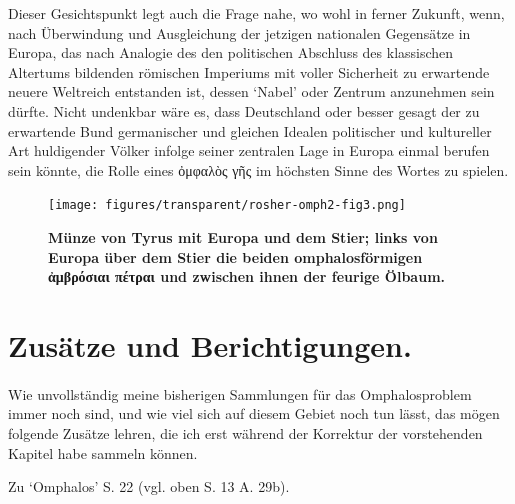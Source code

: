 \documentclass[a4paper, 11pt, oneside]{article}
\begin{document}
Dieser Gesichtspunkt legt auch die Frage nahe, wo wohl in ferner Zukunft, wenn, nach Überwindung und Ausgleichung der jetzigen nationalen Gegensätze in Europa, das nach Analogie des den politischen Abschluss des klassischen Altertums bildenden römischen Imperiums mit voller Sicherheit zu erwartende neuere Weltreich entstanden ist, dessen `Nabel' oder Zentrum anzunehmen sein dürfte. Nicht undenkbar wäre es, dass Deutschland oder besser gesagt der zu erwartende Bund germanischer und gleichen Idealen politischer und kultureller Art huldigender Völker infolge seiner zentralen Lage in Europa einmal berufen sein könnte, die Rolle eines ὀμφαλὸς γῆς im höchsten Sinne des Wortes zu spielen.
\begin{figure}[H]
\centering
\texttt{[image: figures/transparent/rosher-omph2-fig3.png]}
\caption{\bfseries Münze von Tyrus mit Europa und dem Stier; links von Europa über dem Stier die beiden omphalosförmigen ἀμβρόσιαι πέτραι und zwischen ihnen der feurige Ölbaum.}
\end{figure}
\clearpage
\section{Zusätze und Berichtigungen.}
\paragraph{}
Wie unvollständig meine bisherigen Sammlungen für das Omphalosproblem immer noch sind, und wie viel sich auf diesem Gebiet noch tun lässt, das mögen folgende Zusätze lehren, die ich erst während der Korrektur der vorstehenden Kapitel habe sammeln können.

Zu `Omphalos' S. 22 (vgl. oben S. 13 A. 29b).
\end{document}
